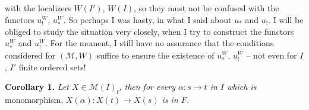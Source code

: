 \documentclass[11pt]{article}
\newcommand{\msp}[1]{\marginpar{\footnotesize [#1]}}
\newcommand{\M}{\mathcal{M}}
\begin{document}
\noindent\msp{page 50}

\noindent with the localizers $W(I')$, $W(I)$, so they must not be confused with the functors $u_{!}^W$, $u_*^W$. So perhaps I was hasty, in what I said about $u_*$ and $u_{!}$. I will be obliged to study the situation very closely, when I try to construct the functors $u_*^W$ and $u_{!}^W$. For the moment, I still have no assurance that the conditions considered for $(\M,W)$ suffice to ensure the existence of $u_*^W$, $u_{!}^W$ – not even for $I$, $I'$ finite ordered sets!

\textbf{Corollary 1.} \textit{Let $X \in \M(I)_{\mathrm{f}}$, then for every $\alpha : s \longrightarrow t$ in $I$ which is} monomorphism, \textit{$X(\alpha) : X(t) \longrightarrow X(s)$ is in $F$.}
\end{document}
